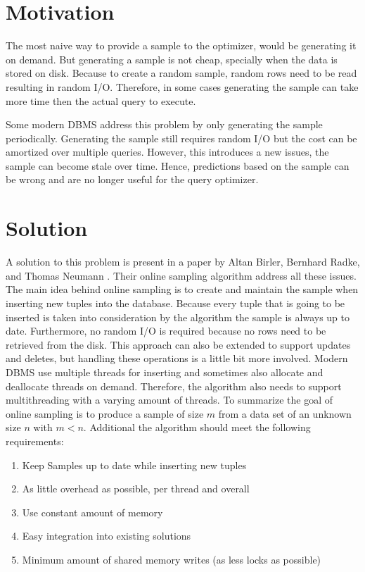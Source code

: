 \documentclass[sigconf,nonacm]{acmart}
\begin{document}
    \section{Motivation} 
        The most naive way to provide a sample to the optimizer, would be generating it on demand. But generating a sample is not cheap, specially when the data is stored on disk. Because to create a random sample, random rows need to be read resulting in random I/O. Therefore, in some cases generating the sample can take more time then the actual query to execute.

        Some modern DBMS address this problem by only generating the sample periodically. Generating the sample still requires random I/O but the cost can be amortized over multiple queries. However, this introduces a new issues, the sample can become stale over time. Hence, predictions based on the sample can be wrong and are no longer useful for the query optimizer.

    \section{Solution}
        A solution to this problem is present in a paper by Altan Birler, Bernhard Radke, and Thomas Neumann \cite{OG}. Their online sampling algorithm address all these issues. The main idea behind online sampling is to create and maintain the sample when inserting new tuples into the database. Because every tuple that is going to be inserted is taken into consideration by the algorithm the sample is always up to date. Furthermore, no random I/O is required because no rows need to be retrieved from the disk. This approach can also be extended to support updates and deletes, but handling these operations is a little bit more involved. Modern DBMS use multiple threads for inserting and sometimes also allocate and deallocate threads on demand. Therefore, the algorithm also needs to support multithreading with a varying amount of threads.
        To summarize the goal of online sampling is to produce a sample of size $m$ from a data set of an unknown size $n$ with $m<n$. Additional the algorithm should meet the following requirements:
        \begin{enumerate}
            \item Keep Samples up to date while inserting new tuples
            \item As little overhead as possible, per thread and overall
            \item Use constant amount of memory
            \item Easy integration into existing solutions
            \item Minimum amount of shared memory writes (as less locks as possible)
        \end{enumerate}
        
\end{document}
